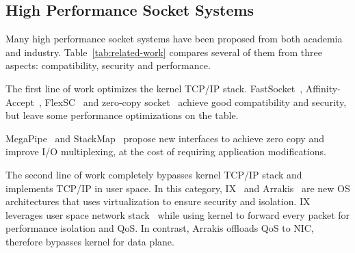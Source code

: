 


\subsection{High Performance Socket Systems}
\label{subsec:related-work}




Many high performance socket systems have been proposed from both academia and industry. Table~\ref{tab:related-work} compares several of them from three aspects: compatibility, security and performance.

 The first line of work optimizes the kernel TCP/IP stack. FastSocket~\cite{lin2016scalable}, Affinity-Accept~\cite{pesterev2012improving}, FlexSC~\cite{soares2010flexsc} and zero-copy socket~\cite{thadani1995efficient,chu1996zero,linux-zero-copy} achieve good compatibility and security, but leave some performance optimizations on the table.

MegaPipe~\cite{han2012megapipe} and StackMap~\cite{yasukata2016stackmap} propose new interfaces to achieve zero copy and improve I/O multiplexing, at the cost of requiring application modifications.

 The second line of work completely bypasses kernel TCP/IP stack and implements TCP/IP in user space. In this category, IX~\cite{belay2017ix} and Arrakis~\cite{peter2016arrakis} are new OS architectures that uses virtualization to ensure security and isolation. IX leverages user space network stack~\cite{dunkels2001design} while using kernel to forward every packet for performance isolation and QoS. In contrast, Arrakis offloads QoS to NIC, therefore bypasses kernel for data plane.%

